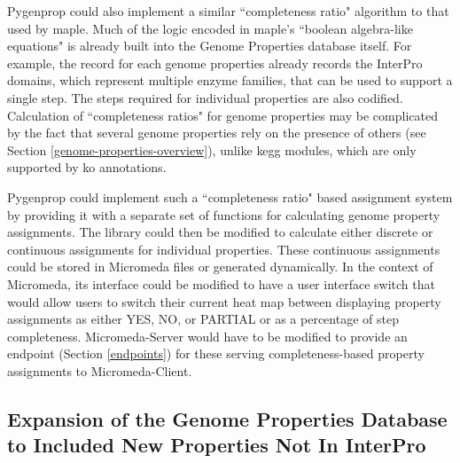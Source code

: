 Pygenprop could also implement a similar ``completeness ratio" algorithm to that 
used by \gls{maple}. Much of the logic encoded in \gls{maple}'s ``boolean 
algebra-like equations" is already built into the Genome Properties database 
itself. For example, the record for each genome properties already records the 
InterPro domains, which represent multiple enzyme families, that can be used to 
support a single step. The steps required for individual properties are also 
codified. Calculation of ``completeness ratios" for genome properties may be 
complicated by the fact that several genome properties rely on the presence of 
others (see Section \ref{genome-properties-overview}), unlike \gls{kegg} 
modules, which are only supported by \gls{ko} annotations.

Pygenprop could implement such a ``completeness ratio" based assignment system 
by providing it with a separate set of functions for calculating genome property 
assignments. The library could then be modified to calculate either discrete or 
continuous assignments for individual properties. These continuous assignments 
could be stored in Micromeda files or generated dynamically. In the context of 
Micromeda, its interface could be modified to have a user interface switch that 
would allow users to switch their current heat map between displaying property 
assignments as either YES, NO, or PARTIAL or as a percentage of step 
completeness. Micromeda-Server would have to be modified to provide an endpoint 
(Section \ref{endpoints}) for these serving completeness-based property 
assignments to Micromeda-Client.

\subsection{Expansion of the Genome Properties Database to Included New 
Properties Not In InterPro}

